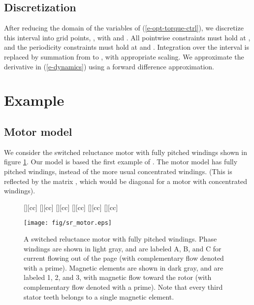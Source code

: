 \documentclass[11pt]{article}
\newif\ifarxiv
\begin{document}
\subsection{Discretization}
After reducing the domain of the variables of (\ref{e-opt-torque-ctrl}),
we discretize this interval
into  grid points, 
, 
with  and .  All
pointwise constraints must hold at , and
the periodicity constraints 
must hold at  and . 
Integration over the interval is replaced by summation from
 to , with appropriate scaling.   
We approximate the derivative in (\ref{e-dynamics}) 
using a forward difference approximation.





\section{Example}
\label{s-example}

\subsection{Motor model}
We consider the switched reluctance motor with fully pitched windings shown in 
figure \ref{f-sr-motor}.
Our model is based the first example of \cite{mecrow2001modeling}.
The motor model has fully pitched windings,
instead of the more usual concentrated windings.
(This is reflected by the matrix ,
which would be diagonal for a motor with concentrated windings).

\begin{figure} 
\begin{center}
[][cc]{} 
[][cc]{} 
[][cc]{} 
[][cc]{} 
[][cc]{} 
[][cc]{} 
\ifarxiv
\texttt{[image: sr\_motor.eps]}
\else
\texttt{[image: fig/sr\_motor.eps]}
\fi
\caption{
A switched reluctance motor with fully pitched windings.
Phase windings are shown in light gray, and are labeled A, B, and C
for current flowing out of the page
(with complementary flow denoted with a prime).
Magnetic elements are shown in dark gray, 
and are labeled 1, 2, and 3, with magnetic flow toward the rotor
(with complementary flow denoted with a prime).
Note that every third stator teeth belongs to a single magnetic element.
}
\label{f-sr-motor}
\end{center}
\end{figure}
\end{document}
